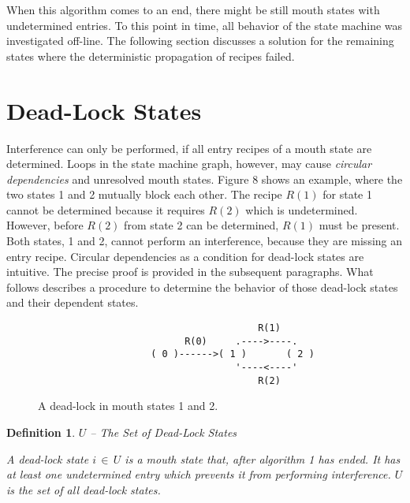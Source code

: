 \documentclass[12pt,a4paper]{scrartcl}
\newtheorem{definition}{Definition}
\begin{document}
When this algorithm comes to an end, there might be still mouth states with
undetermined entries.  To this point in time, all behavior of the state
machine was investigated off-line. The following section discusses a solution 
for the remaining states where the deterministic propagation of recipes failed.

%
\section{Dead-Lock States}

Interference can only be performed, if all entry recipes of a mouth state are
determined. Loops in the state machine graph, however, may cause \textit{circular
dependencies} and unresolved mouth states.  Figure 8 shows an example, where the
two states 1 and 2 mutually block each other. The recipe $R(1)$ for state 1
cannot be determined because it requires $R(2)$ which is undetermined. However,
before $R(2)$ from state 2 can be determined, $R(1)$ must be present. Both
states, 1 and 2, cannot perform an interference, because they are missing an
entry recipe.  Circular dependencies as a condition for dead-lock states are
intuitive. The precise proof is provided in the subsequent paragraphs. What
follows describes a procedure to determine the behavior of those dead-lock
states and their dependent states.

\begin{figure}[htbp] \leavevmode
\begin{verbatim}
                                       R(1)
                          R(0)     .---->----.
                    ( 0 )------>( 1 )       ( 2 )
                                   '----<----'
                                       R(2)

\end{verbatim}
\caption{A dead-lock in mouth states 1 and 2.}
\end{figure}

\begin{definition} $U$ -- The Set of Dead-Lock States

A dead-lock state $i\,\in\,U$ is a mouth state that, after algorithm 1 has
ended. It has at least one undetermined entry which prevents it from performing
interference. $U$ is the set of all dead-lock states.

\end{definition}
\end{document}
